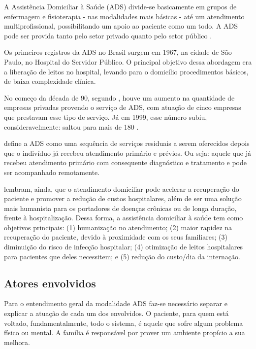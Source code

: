 A Assistência Domiciliar à Saúde (ADS) divide-se basicamente em grupos de
enfermagem e fisioterapia - nas modalidades mais básicas - até um atendimento
multiprofissional, possibilitando um apoio ao paciente como um todo. A ADS pode
ser provida tanto pelo setor privado quanto pelo setor público
\cite{amaral2001assistencia}.

Os primeiros registros da ADS no Brasil surgem em 1967, na cidade de São
Paulo, no Hospital do Servidor Público. O principal objetivo dessa abordagem
era a liberação de leitos no hospital, levando para o domicílio procedimentos
básicos, de baixa complexidade clínica.

No começo da década de 90, segundo ,
houve um aumento na quantidade de empresas privadas provendo o serviço de ADS,
com atuação de cinco empresas que prestavam esse tipo de  serviço. Já em 1999,
esse número subiu, consideravelmente: saltou para mais de 180
\cite{tavolari2000desenvolvimento}.

 define a ADS como uma sequência de serviços
residuais a serem oferecidos depois que o indivíduo já recebeu atendimento
primário e prévios. Ou seja: aquele que já recebeu atendimento primário com
consequente diagnóstico e tratamento e pode ser acompanhado remotamente.

 lembram, ainda, que o atendimento domiciliar
pode acelerar a recuperação do  paciente e promover a redução de custos
hospitalares, além de ser uma solução mais  humanista para os portadores de
doenças crônicas ou de longa duração, frente à  hospitalização. Dessa forma, a
assistência domiciliar à saúde tem como objetivos principais: (1) humanização
no atendimento; (2) maior rapidez na recuperação do paciente, devido à
proximidade com os seus familiares; (3) diminuição do risco de infecção
hospitalar; (4) otimização de leitos hospitalares para pacientes que deles
necessitem; e (5) redução do custo/dia da internação.

\subsection{Atores envolvidos}\label{subsec:envolvidos}

Para o entendimento geral da modalidade ADS faz-se necessário separar e
explicar a atuação de cada um dos envolvidos. O paciente, para quem está
voltado, fundamentalmente, todo o sistema, é aquele que sofre algum problema
físico ou mental. A família é responsável por prover um ambiente propício a sua
melhora. 


